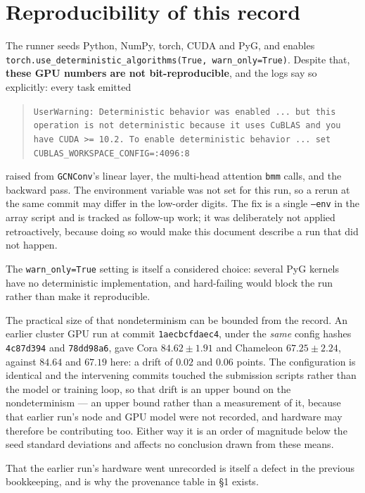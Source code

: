 \documentclass[11pt,a4paper]{article}
\begin{document}
\section{Reproducibility of this record}
\label{sec:determinism}

The runner seeds Python, NumPy, torch, CUDA and PyG, and enables
\texttt{torch.use\_deterministic\_algorithms(True, warn\_only=True)}. Despite that, \textbf{these
GPU numbers are not bit-reproducible}, and the logs say so explicitly: every task emitted

\begin{quote}\small
\texttt{UserWarning: Deterministic behavior was enabled ... but this operation is not
deterministic because it uses CuBLAS and you have CUDA >= 10.2. To enable deterministic behavior
... set CUBLAS\_WORKSPACE\_CONFIG=:4096:8}
\end{quote}

raised from \texttt{GCNConv}'s linear layer, the multi-head attention \texttt{bmm} calls, and the
backward pass. The environment variable was not set for this run, so a rerun at the same commit may
differ in the low-order digits. The fix is a single \texttt{--env} in the array script and is
tracked as follow-up work; it was deliberately not applied retroactively, because doing so would
make this document describe a run that did not happen.

The \texttt{warn\_only=True} setting is itself a considered choice: several PyG kernels have no
deterministic implementation, and hard-failing would block the run rather than make it
reproducible.

The practical size of that nondeterminism can be bounded from the record. An earlier cluster GPU
run at commit \texttt{1aecbcfdaec4}, under the \emph{same} config hashes \texttt{4c87d394} and
\texttt{78dd98a6}, gave Cora $84.62 \pm 1.91$ and Chameleon $67.25 \pm 2.24$, against $84.64$ and
$67.19$ here: a drift of $0.02$ and $0.06$ points. The configuration is identical and the
intervening commits touched the submission scripts rather than the model or training loop, so that
drift is an upper bound on the nondeterminism --- an upper bound rather than a measurement of it,
because that earlier run's node and GPU model were not recorded, and hardware may therefore be
contributing too. Either way it is an order of magnitude below the seed standard deviations and
affects no conclusion drawn from these means.

That the earlier run's hardware went unrecorded is itself a defect in the previous bookkeeping, and
is why the provenance table in \S1 exists.
\end{document}
